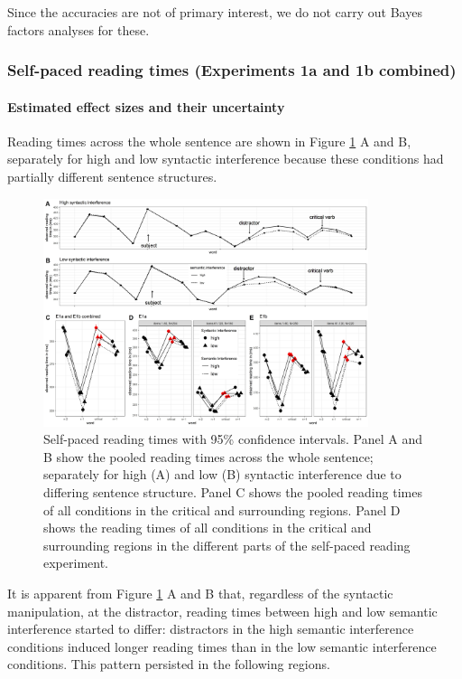 \documentclass[a4paper, man, floatsintext]{apa7}
\begin{document}
Since the accuracies are not of primary interest, we do not carry out Bayes factors analyses for these.

\subsubsection{Self-paced reading times (Experiments 1a and 1b combined)}

\paragraph{Estimated effect sizes and their uncertainty}

Reading times across the whole sentence are shown in Figure \ref{fig:whole_sentence} A and B, separately for high and low syntactic interference because these conditions had partially different sentence structures. 

\begin{figure}
    \caption{Self-paced reading times with 95\% confidence intervals. Panel A and B show the pooled reading times across the whole sentence; separately for high (A) and low (B) syntactic interference due to differing sentence structure. Panel C shows the pooled reading times of all conditions in the critical and surrounding regions. Panel D shows the reading times of all conditions in the critical and surrounding regions in the different parts of the self-paced reading experiment.}
    \label{fig:whole_sentence}
    \centering
    \includegraphics[width=0.85\textwidth]{images/Pandora_all_wholesentence_pooled_zoom_exp.jpg}
\end{figure}
\clearpage

It is apparent from Figure \ref{fig:whole_sentence} A and B that, regardless of the syntactic manipulation, at the distractor, reading times between high and low semantic interference started to differ: distractors in the high semantic interference conditions induced longer reading times than in the low semantic interference conditions. This pattern persisted in the following regions.
\end{document}
